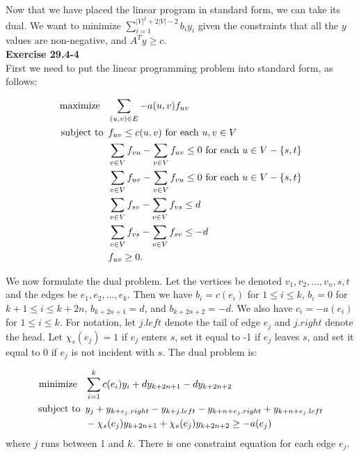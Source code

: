 \documentclass{article}
\begin{document}
Now that we have placed the linear program in standard form, we can take its dual. We want to minimize $\sum_{i=1}^{|V|^2+2|V|-2} b_i y_i$ given the constraints that all the $y$ values are non-negative, and $A^T y \ge c$.\\

\noindent\textbf{Exercise 29.4-4}\\

First we need to put the linear programming problem into standard form, as follows:

\begin{align*}
\mbox{maximize \,\,\,} & \sum_{(u,v) \in E} -a(u,v)f_{uv}\\
\mbox{subject to \,} & f_{uv} \leq c(u,v) \mbox{ for each } u,v \in V \\
& \sum_{v \in V} f_{vu} - \sum_{v \in V} f_{uv} \leq 0 \mbox{ for each } u \in V - \{s,t\} \\
& \sum_{v \in V} f_{uv} - \sum_{v \in V} f_{vu} \leq 0 \mbox{ for each } u \in V - \{s,t\} \\
& \sum_{v \in V} f_{sv} - \sum_{v \in V} f_{vs} \leq d \\
& \sum_{v \in V} f_{vs} - \sum_{v \in V} f_{sv} \leq -d \\ 
& f_{uv} \geq 0.\\
\end{align*}

We now formulate the dual problem.  Let the vertices be denoted $v_1, v_2, \ldots, v_n, s, t$ and the edges be $e_1, e_2, \ldots, e_k$.  Then we have $b_i = c(e_i)$ for $1 \leq i \leq k$, $b_i = 0$ for $k+1 \leq i \leq k+2n$, $b_{k+2n+1} = d$, and $b_{k+2n+2} = -d$. We also have $c_i = -a(e_i)$ for $1 \leq i \leq k$.  For notation, let $j.left$ denote the tail of edge $e_j$ and $j.right$ denote the head.  Let $\chi_s(e_j) = 1$ if $e_j$ enters $s$, set it equal to -1 if $e_j$ leaves $s$, and set it equal to $0$ if $e_j$ is not incident with $s$.  The dual problem is:

\begin{align*}
\mbox{minimize \,\,\,} & \sum_{i=1}^k c(e_i)y_i + dy_{k+2n+1} - dy_{k+2n+2}\\
\mbox{subject to \,} & y_j + y_{k+e_j.right} - y_{k+j.left} - y_{k+n+e_j.right} + y_{k + n + e_j.left} \\
& - \chi_s(e_j)y_{k+2n+1} + \chi_s(e_j) y_{k+2n+2} \geq -a(e_j)
\end{align*}
where $j$ runs between 1 and $k$.  There is one constraint equation for each edge $e_j$. 
\end{document}
